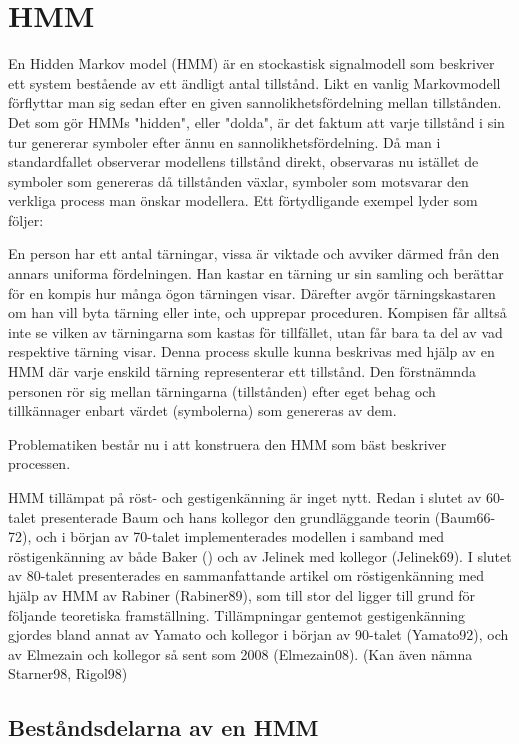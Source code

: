 \documentclass[../rapport_MVEX01-11-05]{subfiles}
\begin{document}
\section{HMM}

En Hidden Markov model (HMM) är en stockastisk signalmodell som
beskriver ett system bestående av ett ändligt antal tillstånd. Likt en
vanlig Markovmodell förflyttar man sig sedan efter en given
sannolikhetsfördelning mellan tillstånden. Det som gör HMMs "hidden",
eller "dolda", är det faktum att varje tillstånd i sin tur genererar
symboler efter ännu en sannolikhetsfördelning. Då man i standardfallet
observerar modellens tillstånd direkt, observaras nu istället de
symboler som genereras då tillstånden växlar, symboler som motsvarar
den verkliga process man önskar modellera. Ett förtydligande exempel
lyder som följer: 

En person har ett antal tärningar, vissa är viktade och avviker därmed
från den annars uniforma fördelningen. Han kastar en tärning ur sin
samling och berättar för en kompis hur många ögon tärningen
visar. Därefter avgör tärningskastaren om han vill byta tärning eller
inte, och upprepar proceduren. Kompisen får alltså inte se vilken av
tärningarna som kastas för tillfället, utan får bara ta del av vad
respektive tärning visar. Denna process skulle kunna beskrivas med
hjälp av en HMM där varje enskild tärning representerar ett
tillstånd. Den förstnämnda personen rör sig mellan tärningarna
(tillstånden) efter eget behag och tillkännager enbart värdet
(symbolerna) som genereras av dem. 

Problematiken består nu i att konstruera den HMM som bäst beskriver
processen.  

HMM tillämpat på röst- och gestigenkänning är inget nytt. Redan i
slutet av 60-talet presenterade Baum och hans kollegor den
grundläggande teorin (Baum66-72), och i början av 70-talet
implementerades modellen i samband med röstigenkänning av både Baker
(\cite{Baker75}) och av Jelinek med kollegor (Jelinek69). I slutet av
80-talet presenterades en sammanfattande artikel om röstigenkänning
med hjälp av HMM av Rabiner (Rabiner89), som till stor del ligger till
grund för följande teoretiska framställning. Tillämpningar gentemot
gestigenkänning gjordes bland annat av Yamato och kollegor i början av
90-talet (Yamato92), och av Elmezain och kollegor så sent som 2008
(Elmezain08). (Kan även nämna Starner98, Rigol98)

\subsection{Beståndsdelarna av en HMM}
\end{document}
